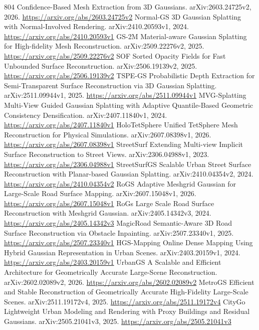 \documentclass[11pt]{article}
\begin{document}
\begin{thebibliography}{804}
 Confidence-Based Mesh Extraction from 3D Gaussians. arXiv:2603.24725v2, 2026. \url{https://arxiv.org/abs/2603.24725v2}
 Normal-GS 3D Gaussian Splatting with Normal-Involved Rendering. arXiv:2410.20593v1, 2024. \url{https://arxiv.org/abs/2410.20593v1}
 GS-2M Material-aware Gaussian Splatting for High-fidelity Mesh Reconstruction. arXiv:2509.22276v2, 2025. \url{https://arxiv.org/abs/2509.22276v2}
 SOF Sorted Opacity Fields for Fast Unbounded Surface Reconstruction. arXiv:2506.19139v2, 2025. \url{https://arxiv.org/abs/2506.19139v2}
 TSPE-GS Probabilistic Depth Extraction for Semi-Transparent Surface Reconstruction via 3D Gaussian Splatting. arXiv:2511.09944v1, 2025. \url{https://arxiv.org/abs/2511.09944v1}
 MVG-Splatting Multi-View Guided Gaussian Splatting with Adaptive Quantile-Based Geometric Consistency Densification. arXiv:2407.11840v1, 2024. \url{https://arxiv.org/abs/2407.11840v1}
 HoloTetSphere Unified TetSphere Mesh Reconstruction for Physical Simulations. arXiv:2607.08398v1, 2026. \url{https://arxiv.org/abs/2607.08398v1}
 StreetSurf Extending Multi-view Implicit Surface Reconstruction to Street Views. arXiv:2306.04988v1, 2023. \url{https://arxiv.org/abs/2306.04988v1}
 StreetSurfGS Scalable Urban Street Surface Reconstruction with Planar-based Gaussian Splatting. arXiv:2410.04354v2, 2024. \url{https://arxiv.org/abs/2410.04354v2}
 RoGS Adaptive Meshgrid Gaussian for Large-Scale Road Surface Mapping. arXiv:2607.15048v1, 2026. \url{https://arxiv.org/abs/2607.15048v1}
 RoGs Large Scale Road Surface Reconstruction with Meshgrid Gaussian. arXiv:2405.14342v3, 2024. \url{https://arxiv.org/abs/2405.14342v3}
 MagicRoad Semantic-Aware 3D Road Surface Reconstruction via Obstacle Inpainting. arXiv:2507.23340v1, 2025. \url{https://arxiv.org/abs/2507.23340v1}
 HGS-Mapping Online Dense Mapping Using Hybrid Gaussian Representation in Urban Scenes. arXiv:2403.20159v1, 2024. \url{https://arxiv.org/abs/2403.20159v1}
 UrbanGS A Scalable and Efficient Architecture for Geometrically Accurate Large-Scene Reconstruction. arXiv:2602.02089v2, 2026. \url{https://arxiv.org/abs/2602.02089v2}
 MetroGS Efficient and Stable Reconstruction of Geometrically Accurate High-Fidelity Large-Scale Scenes. arXiv:2511.19172v4, 2025. \url{https://arxiv.org/abs/2511.19172v4}
 CityGo Lightweight Urban Modeling and Rendering with Proxy Buildings and Residual Gaussians. arXiv:2505.21041v3, 2025. \url{https://arxiv.org/abs/2505.21041v3}

\end{thebibliography}
\end{document}
